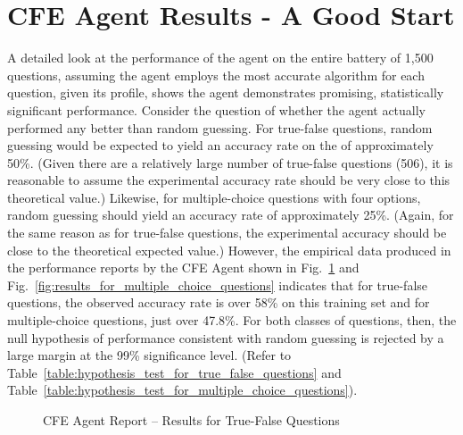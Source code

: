 \section{CFE Agent Results - A Good Start}

A detailed look at the performance of the agent on the entire battery of 1,500 questions, assuming the agent employs the most accurate algorithm for each question, given its profile, shows the agent demonstrates promising, statistically significant performance.  Consider the question of whether the agent actually performed any better than random guessing.  For true-false questions, random guessing would be expected to yield an accuracy rate on the of approximately 50\%.  (Given there are a relatively large number of true-false questions (506), it is reasonable to assume the experimental accuracy rate should be very close to this theoretical value.)  Likewise, for multiple-choice questions with four options, random guessing should yield an accuracy rate of approximately 25\%.  (Again, for the same reason as for true-false questions, the experimental accuracy should be close to the theoretical expected value.)  However, the empirical data produced in the performance reports by the CFE Agent shown in Fig.~\ref{fig:results_for_true_false_questions} and Fig.~\ref{fig:results_for_multiple_choice_questions} indicates that for true-false questions, the observed accuracy rate is over 58\% on this training set and for multiple-choice questions, just over 47.8\%.  For both classes of questions, then, the null hypothesis of performance consistent with random guessing is rejected by a large margin at the 99\% significance level.  (Refer to  Table~\ref{table:hypothesis_test_for_true_false_questions} and Table~\ref{table:hypothesis_test_for_multiple_choice_questions}).


\begin{figure}
\centering
{}
\caption{CFE Agent Report -- Results for True-False Questions}
\label{fig:results_for_true_false_questions}
\end{figure}


